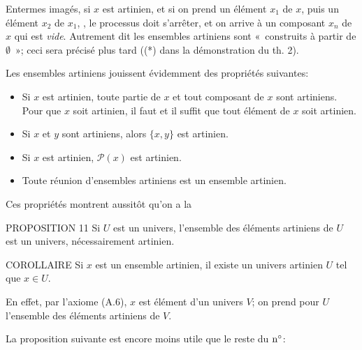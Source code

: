 En\pageoriginale termes imagés, si $x$ est artinien, et si on prend
un élément $x_1$ de $x$, puis un élément $x_2$ de $x_1$, \etc, le
processus doit s'arrêter, et on arrive à un composant $x_n$ de $x$
qui est \emph{vide}. Autrement dit les ensembles artiniens sont
« construits à partir de $∅$ »; ceci sera précisé plus
tard (\cf (*) dans la démonstration du th. 2).

Les ensembles artiniens jouissent évidemment des propriétés
suivantes:
\begin{itemize}
\item[(AR.I)] Si $x$ est artinien, toute partie de $x$ et tout
composant de $x$ sont artiniens. Pour que $x$ soit artinien, il faut
et il suffit que tout élément de $x$ soit artinien.

\item[(AR.II)] Si $x$ et $y$ sont artiniens, alors $\{x,y\}$ est
artinien.

\item[(AR.III)] Si $x$ est artinien, $\mathcal{P}(x)$ est artinien.

\item[(AR.IV)] Toute réunion d'ensembles artiniens est un ensemble
artinien.
\end{itemize}

Ces propriétés montrent aussitôt qu'on a la

\begin{enonce*}{PROPOSITION 11}
Si $U$ est un univers, l'ensemble des éléments artiniens de $U$ est
un univers, nécessairement artinien.
\end{enonce*}

\begin{enonce*}{COROLLAIRE}
Si $x$ est un ensemble artinien, il existe un univers artinien $U$
tel que $x\in U$.
\end{enonce*}

En effet, par l'axiome (A.6), $x$ est élément d'un univers $V$; on
prend pour $U$ l'ensemble des éléments artiniens de $V$.

La proposition suivante est encore moins utile que le reste du ${\rm
n^{\circ}}$:

